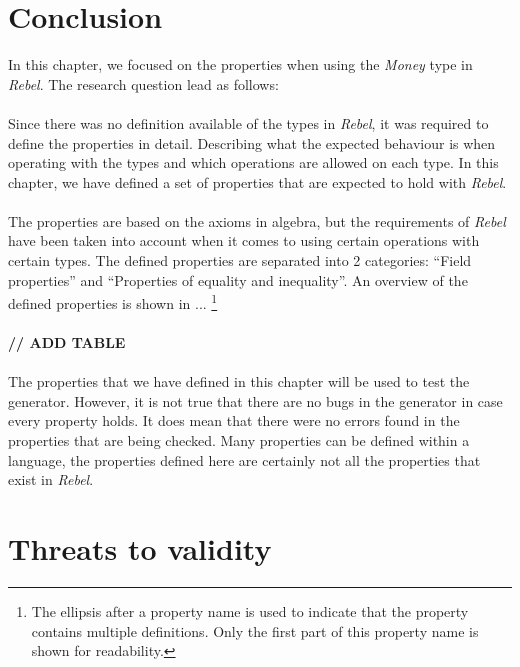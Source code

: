 \section{Conclusion}
In this chapter, we focused on the properties when using the \textit{Money}
type in \textit{Rebel}. The research question lead as follows:\rqOne\\
\\
Since there was no definition available of the types in \textit{Rebel}, it was
required to define the properties in detail. Describing what the expected
behaviour is when operating with the types and which operations are allowed on
each type. In this chapter, we have defined a set of properties that are
expected to hold with \textit{Rebel}.\\
\\
The properties are based on the axioms in algebra, but the requirements of
\textit{Rebel} have been taken into account when it comes to using certain
operations with certain types. The defined properties are separated into 2
categories: ``Field properties'' and ``Properties of equality and inequality''.
An overview of the defined properties is shown in ...
\footnote{The ellipsis after a property name is used to indicate that the
property contains multiple definitions. Only the first part of this property
name is shown for readability.}\\
\\
\textbf{// ADD TABLE}
\\
\\
The properties that we have defined in this chapter will be used to test the
generator. However, it is not true that there are no bugs in the generator in
case every property holds. It does mean that there were no errors found in the
properties that are being checked. Many properties can be defined within a
language, the properties defined here are certainly not all the properties that
exist in \textit{Rebel}.

\section{Threats to validity}
